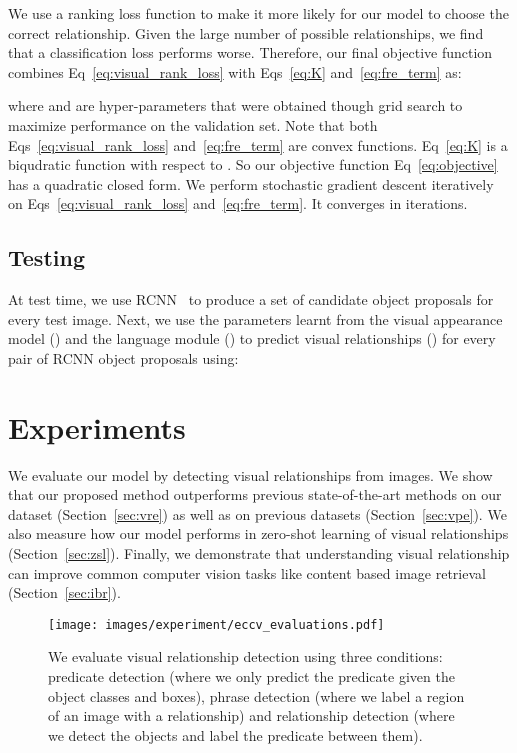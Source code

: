 \documentclass[runningheads]{llncs}
\begin{document}
We use a ranking loss function to make it more likely for our model to choose the correct relationship. Given the large number of possible relationships, we find that a classification loss performs worse. Therefore, our final objective function combines Eq~\ref{eq:visual_rank_loss} with Eqs~\ref{eq:K} and~\ref{eq:fre_term} as:
{\small

}
where  and  are hyper-parameters that were obtained though grid search to maximize performance on the validation set. Note that both  Eqs~\ref{eq:visual_rank_loss} and~\ref{eq:fre_term} are convex functions. Eq~\ref{eq:K} is a biqudratic function with respect to . So our objective function Eq~\ref{eq:objective} has a quadratic closed form. We perform stochastic gradient descent iteratively on Eqs~\ref{eq:visual_rank_loss} and~\ref{eq:fre_term}. It converges in  iterations.

\subsection{Testing} \label{sec:testing}

At test time, we use RCNN~\cite{girshick14CVPR} to produce a set of candidate object proposals for every test image. Next, we use the parameters learnt from the visual appearance model () and the language module () to predict visual relationships () for every pair of RCNN object proposals  using:


\section{Experiments}
\label{sec:experiments}
We evaluate our model by detecting visual relationships from images. We show that our proposed method outperforms previous state-of-the-art methods on our dataset (Section~\ref{sec:vre}) as well as on previous datasets (Section~\ref{sec:vpe}). We also measure how our model performs in zero-shot learning of visual relationships (Section~\ref{sec:zsl}). Finally, we demonstrate that understanding visual relationship can improve common computer vision tasks like content based image retrieval (Section~\ref{sec:ibr}).

\begin{figure}[t]
\centering
\setlength{\belowcaptionskip}{-20pt}
\texttt{[image: images/experiment/eccv\_evaluations.pdf]}
\caption{We evaluate visual relationship detection using three conditions: predicate detection (where we only predict the predicate given the object classes and boxes), phrase detection (where we label a region of an image with a relationship) and relationship detection (where we detect the objects and label the predicate between them).}
\label{fig:evaluations}
\end{figure}
\end{document}
